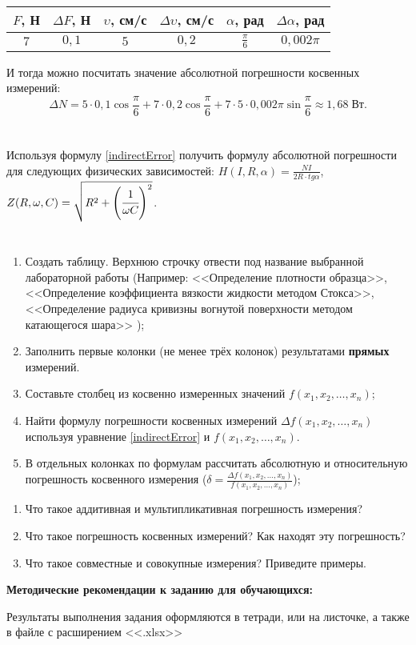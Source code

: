 \documentclass[14pt,a4paper]{article}
\begin{document}
\begin{tabular}{|c|c|c|c|c|c|}
    \hline
    $F$, Н & $\Delta F$, Н & $\upsilon$, см/с & $\Delta \upsilon$, см/с & $\alpha$, рад & $\Delta \alpha$, рад\\ \hline
    $7$ & $0,1$ & $5$ & $0,2$ & $\frac{\pi}{6}$ & $0,002\pi$ \\ \hline
\end{tabular}

И тогда можно посчитать значение абсолютной погрешности косвенных измерений:
\begin{equation}
    \Delta N = 5 \cdot 0,1 \cos{\frac{\pi}{6}} + 7\cdot 0,2\cos{\frac{\pi}{6}} + 7\cdot 5 \cdot 0,002\pi\sin{\frac{\pi}{6}} \approx 1,68\;\text{Вт}.
\end{equation}
\progress{}
\section{}
Используя формулу \ref{indirectError} получить формулу абсолютной погрешности для следующих физических зависимостей:
$H(I,R,\alpha) = \frac{NI}{2R\cdot tg\alpha}$, $Z(R,\omega, C) = \sqrt{R^2+\left (\cfrac{1}{\omega C} \right )^2}$. \\
\section{}
\begin{enumerate}
    \item Создать таблицу. Верхнюю строчку отвести под название выбранной лабораторной работы (Например: <<Определение плотности образца>>, <<Определение  коэффициента вязкости жидкости  методом Стокса>>, <<Определение радиуса кривизны вогнутой поверхности методом катающегося шара>> );
    \item Заполнить первые колонки (не менее трёх колонок) результатами \textbf{прямых} измерений.
    \item Составьте столбец из косвенно измеренных значений $f(x_1, x_2, \ldots, x_n)$;
    \item Найти формулу погрешности косвенных измерений $\Delta f(x_1, x_2, \ldots, x_n)$ используя уравнение \ref{indirectError} и $f(x_1, x_2, \ldots, x_n)$. 
    \item В отдельных колонках по формулам рассчитать абсолютную и относительную погрешность косвенного измерения ($\delta  = \frac{\Delta f(x_1, x_2, \ldots, x_n)}{f(x_1, x_2, \ldots, x_n)}$);
\end{enumerate}

\questions{}
\begin{enumerate}
    \item Что такое аддитивная и мультипликативная погрешность измерения?
    \item Что такое погрешность косвенных измерений? Как находят эту погрешность?
    \item Что такое совместные и совокупные измерения? Приведите примеры.
\end{enumerate}

\textbf{Методические рекомендации к заданию для обучающихся:} 

Результаты выполнения задания оформляются в тетради, или на листочке, а также в файле с расширением <<.xlsx>>
% 
\end{document}
